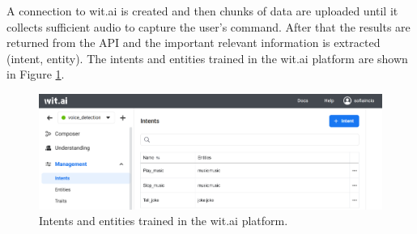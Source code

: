 A connection to wit.ai is created and then chunks of data are uploaded until it collects sufficient audio to capture the user's command. After that the results are returned from the API and the important relevant information is extracted (intent, entity). The intents and entities trained in the wit.ai platform are shown in Figure \ref{fig:WitAI}.

\begin{figure}[H]
    \centering
    \includegraphics[width=1\textwidth]{Images/witai.png}
    \caption{Intents and entities trained in the wit.ai platform.}
    \label{fig:WitAI}
\end{figure}




